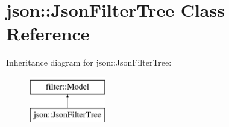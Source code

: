 \hypertarget{classjson_1_1_json_filter_tree}{}\section{json\+:\+:Json\+Filter\+Tree Class Reference}
\label{classjson_1_1_json_filter_tree}
Inheritance diagram for json\+:\+:Json\+Filter\+Tree\+:\begin{figure}[H]
\begin{center}
\leavevmode
\includegraphics[height=2.000000cm]{d9/d9b/classjson_1_1_json_filter_tree}
\end{center}
\end{figure}
